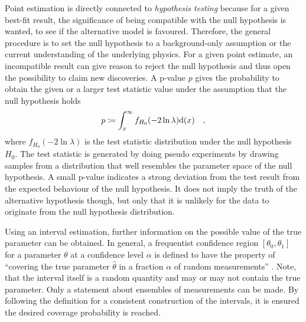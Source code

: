 Point estimation is directly connected to \emph{hypothesis testing} because for a given best-fit result, the significance of being compatible with the null hypothesis is wanted, to see if the alternative model is favoured.
Therefore, the general procedure is to set the null hypothesis to a background-only assumption or the current understanding of the underlying physics.
For a given point estimate, an incompatible result can give reason to reject the null hypothesis and thus open the possibility to claim new discoveries.
A p-value $p$ gives the probability to obtain the given or a larger test statistic value under the assumption that the null hypothesis holds
\begin{equation}
  p \coloneqq \int_x^\infty f_{H_0}(-2\ln\lambda) \mathrm{d}(x)
  \quad\text{,}
\end{equation}
where $f_{H_0}(-2\ln\lambda)$ is the test statistic distribution under the null hypothesis $H_0$.
The test statistic is generated by doing pseudo experiments by drawing samples from a distribution that well resembles the parameter space of the null hypothesis.
A small p-value indicates a strong deviation from the test result from the expected behaviour of the null hypothesis.
It does not imply the truth of the alternative hypothesis though, but only that it is unlikely for the data to originate from the null hypothesis distribution.

Using an interval estimation, further information on the possible value of the true parameter can be obtained.
In general, a frequentist confidence region $[\theta_0, \theta_1]$ for a parameter $\theta$ at a confidence level $\alpha$ is defined to have the property of \enquote{covering the true parameter $\hat{\theta}$ in a fraction $\alpha$ of random measurements} \cite{casella2002statistical}.
Note, that the interval itself is a random quantity and may or may not contain the true parameter.
Only a statement about ensembles of measurements can be made.
By following the definition for a consistent construction of the intervals, it is ensured the desired coverage probability is reached.

